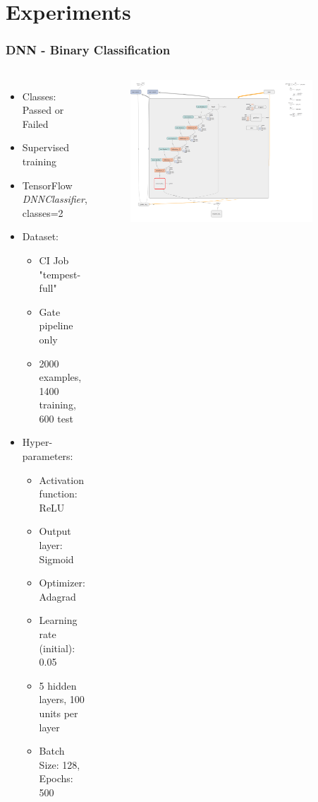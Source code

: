 \documentclass[aspectratio=169,11pt,hyperref={colorlinks=true}]{beamer}
\begin{document}
\section{Experiments}
\begin{frame}
    \frametitle{DNN - Binary Classification}
    \begin{columns}
        \begin{itemize}
            \item{Classes: Passed or Failed}
            \item{Supervised training}
            \item{TensorFlow \emph{DNNClassifier}, classes=2}
            \item{Dataset:}
            \begin{itemize}
              \item{CI Job "tempest-full"}
              \item{Gate pipeline only}
              \item{2000 examples, 1400 training, 600 test}
            \end{itemize}
            \item{Hyper-parameters:}
            \begin{itemize}
              \item{Activation function: ReLU}
              \item{Output layer: Sigmoid}
              \item{Optimizer: Adagrad}
              \item{Learning rate (initial): 0.05}
              \item{5 hidden layers, 100 units per layer}
              \item{Batch Size: 128, Epochs: 500}
            \end{itemize}
        \end{itemize}
        \begin{figure}
        \begin{center}
          \includegraphics[width=0.9\textwidth]{diagrams/binary_class_network_diagram.png}

\end{center}
\end{figure}
\end{columns}
\end{frame}
\end{document}
